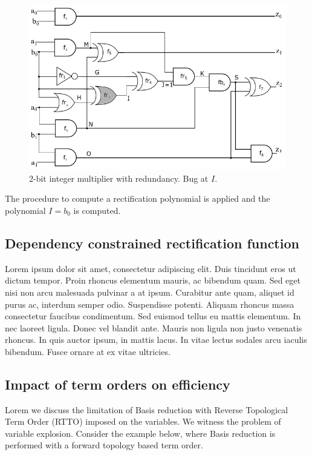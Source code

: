 \begin{figure}[htp]
    \centering
    \includegraphics[scale = 0.5]{int2_red_bI.png}
    \caption{2-bit integer multiplier with redundancy. Bug at $I$.}
    \label{fig:2bit_redbI}
\end{figure}

The procedure to compute a rectification polynomial is applied and the polynomial $I = b_0$ is computed.

\subsection{Dependency constrained rectification function}

Lorem ipsum dolor sit amet, consectetur adipiscing elit. Duis tincidunt eros ut dictum tempor. Proin rhoncus elementum mauris, ac bibendum quam. Sed eget nisi non arcu malesuada pulvinar a at ipsum. Curabitur ante quam, aliquet id purus ac, interdum semper odio. Suspendisse potenti. Aliquam rhoncus massa consectetur faucibus condimentum. Sed euismod tellus eu mattis elementum. In nec laoreet ligula. Donec vel blandit ante. Mauris non ligula non justo venenatis rhoncus. In quis auctor ipsum, in mattis lacus. In vitae lectus sodales arcu iaculis bibendum. Fusce ornare at ex vitae ultricies.

\subsection{Impact of term orders on efficiency}

Lorem we discuss the limitation of \Grobner Basis reduction with Reverse Topological Term Order (RTTO) imposed on the variables. We witness the problem of variable explosion. Consider the example below, where \Grobner Basis reduction is performed with a forward topology based term order. 

